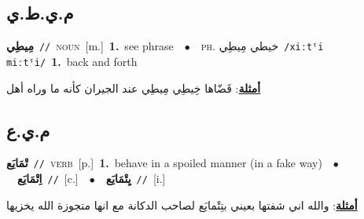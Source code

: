 \documentclass[10pt,a4paper,twoside]{article} %
\begin{document}
\begin{multicols}{2}
\vspace{-3mm}
\subsection*{\color{blue}\foreignlanguage{arabic}{م.ي.ط.ي}\color{blue}{}} 

{\setlength\topsep{0pt}\textbf{\foreignlanguage{arabic}{مِيطِي}}\ {\color{gray}\texttt{//}\color{black}}\ \textsc{noun}\ [m.]\ \textbf{1.}~see phrase\ \ $\bullet$\ \ \textsc{ph.} \color{gray} \foreignlanguage{arabic}{خيطي مِيطِي}\color{black}\ {\color{gray}\texttt{/{\sffamily xiːtˤi miːtˤi}/}\color{black}}\ \textbf{1.}~back and forth\  \begin{flushright}\color{gray}\foreignlanguage{arabic}{\textbf{\underline{\foreignlanguage{arabic}{أمثلة}}}: قَضّاها خِيطِي مِيطِي عند الجيران كأنه ما وراه أهل}\end{flushright}\color{black}} \vspace{2mm}

\vspace{-3mm}
\subsection*{\color{blue}\foreignlanguage{arabic}{م.ي.ع}\color{blue}{}} 

{\setlength\topsep{0pt}\textbf{\foreignlanguage{arabic}{تْمَايَع}}\ {\color{gray}\texttt{//}\color{black}}\ \textsc{verb}\ [p.]\ \textbf{1.}~behave in a spoiled manner (in a fake way)\ \ $\bullet$\ \ \setlength\topsep{0pt}\textbf{\foreignlanguage{arabic}{اِتْمَايَع}}\ {\color{gray}\texttt{//}\color{black}}\ [c.]\ \ $\bullet$\ \ \setlength\topsep{0pt}\textbf{\foreignlanguage{arabic}{يِتْمَايَع}}\ {\color{gray}\texttt{//}\color{black}}\ [i.]\  \begin{flushright}\color{gray}\foreignlanguage{arabic}{\textbf{\underline{\foreignlanguage{arabic}{أمثلة}}}: والله اني شفتها بعيني بتِتْمايَع لصاحب الدكانة مع انها متجوزة الله يخزيها}\end{flushright}\color{black}} \vspace{2mm}


\end{multicols}
\end{document}
